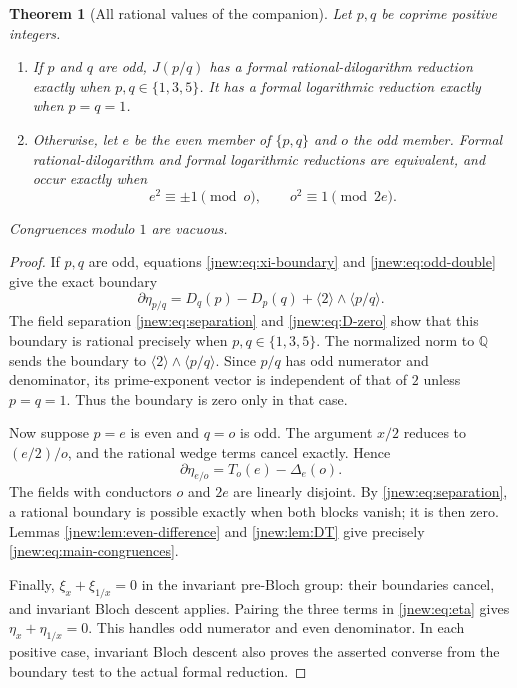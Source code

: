 \documentclass[11pt,a4paper]{article}
\newtheorem{theorem}{Theorem}[section]
\theoremstyle{definition}
\theoremstyle{remark}
\numberwithin{equation}{section}
\begin{document}
\begin{theorem}[All rational values of the companion]
\label{jnew:thm:classification}
Let $p,q$ be coprime positive integers.
\begin{enumerate}
\item If $p$ and $q$ are odd, $J(p/q)$ has a formal
      rational-dilogarithm reduction exactly when
      $p,q\in\{1,3,5\}$. It has a formal logarithmic reduction
      exactly when $p=q=1$.
\item Otherwise, let $e$ be the even member of $\{p,q\}$ and $o$
      the odd member. Formal rational-dilogarithm and formal logarithmic
      reductions are equivalent, and occur exactly when
\begin{equation}\label{jnew:eq:main-congruences}
 \boxed{\qquad e^2\equiv\pm1\pmod o,
                  \qquad o^2\equiv1\pmod{2e}.\qquad}
\end{equation}
\end{enumerate}
Congruences modulo $1$ are vacuous.
\end{theorem}
\begin{proof}
If $p,q$ are odd, equations \eqref{jnew:eq:xi-boundary} and
\eqref{jnew:eq:odd-double} give the exact boundary
\begin{equation}\label{jnew:eq:odd-boundary}
 \partial\eta_{p/q}
 =D_q(p)-D_p(q)+\langle2\rangle\wedge\langle p/q\rangle.
\end{equation}
The field separation \eqref{jnew:eq:separation} and
\eqref{jnew:eq:D-zero} show that this boundary is rational precisely
when $p,q\in\{1,3,5\}$. The normalized norm to $\mathbb Q$ sends
the boundary to $\langle2\rangle\wedge\langle p/q\rangle$.
Since $p/q$ has odd numerator and denominator, its prime-exponent
vector is independent of that of $2$ unless $p=q=1$. Thus the
boundary is zero only in that case.

Now suppose $p=e$ is even and $q=o$ is odd. The argument $x/2$
reduces to $(e/2)/o$, and the rational wedge terms cancel exactly.
Hence
\begin{equation}\label{jnew:eq:even-boundary}
 \partial\eta_{e/o}=T_o(e)-\Delta_e(o).
\end{equation}
The fields with conductors $o$ and $2e$ are linearly disjoint.
By \eqref{jnew:eq:separation}, a rational boundary is possible
exactly when both blocks vanish; it is then zero. Lemmas
\ref{jnew:lem:even-difference} and \ref{jnew:lem:DT} give precisely
\eqref{jnew:eq:main-congruences}.

Finally, $\xi_x+\xi_{1/x}=0$ in the invariant pre-Bloch group:
their boundaries cancel, and invariant Bloch descent applies.
Pairing the three terms in \eqref{jnew:eq:eta} gives
$\eta_x+\eta_{1/x}=0$. This handles odd numerator and even
denominator. In each positive case, invariant Bloch descent also
proves the asserted converse from the boundary test to the actual
formal reduction.
\end{proof}
\end{document}
